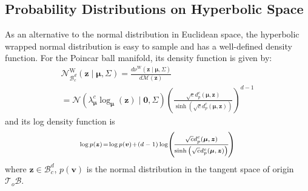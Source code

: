 \documentclass[letterpaper]{article} %
\begin{document}

\subsection{Probability Distributions on Hyperbolic Space}\label{section:4.1}
As an alternative to the normal distribution in Euclidean space, the hyperbolic wrapped normal distribution  \cite{nagano2019wrapped,mathieu2019continuous} is easy to sample and has a well-defined density function. For the Poincar ball manifold, its density function is given by:
\begin{equation}
\begin{array}{l}
\mathcal{N}_{\mathcal{B}_{c}^{d}}^{\mathrm{W}}(\boldsymbol{z} \mid \boldsymbol{\mu}, \Sigma)=\frac{d \nu^{\mathrm{W}}(\boldsymbol{z} \mid \boldsymbol{\mu}, \Sigma)}{d \mathcal{M}(\boldsymbol{z})} \\
=\mathcal{N}\left(\lambda_{\boldsymbol{\mu}}^{c} \log _{\boldsymbol{\mu}}(\boldsymbol{z}) \mid \mathbf{0}, \Sigma\right)\left(\frac{\sqrt{c} d_{p}^{c}(\boldsymbol{\mu}, \boldsymbol{z})}{\sinh \left(\sqrt{c} d_{p}^{c}(\boldsymbol{\mu}, \boldsymbol{z})\right)}\right)^{d-1}
\end{array}
\end{equation}
and its log density function is
\begin{equation}\label{8}
\begin{scriptsize}
\log p(\boldsymbol{z})\!=\!\log p(\boldsymbol{v})\!+\!(d-1)\log\! \left(\!\frac{ \sqrt{c} d_{p}^{c}(\boldsymbol{\mu}, \boldsymbol{z})}{\sinh\left(\sqrt{c} d_{p}^{c}(\boldsymbol{\mu}, \boldsymbol{z})\right)}\!\right)
\end{scriptsize}
\end{equation}
where $\boldsymbol{z}\in \mathcal{B}_{c}^{d}$,
$p(\boldsymbol{v})$ is the normal distribution in the tangent space of origin $\mathcal{T}_{o} \mathcal{B}$.
\end{document}
